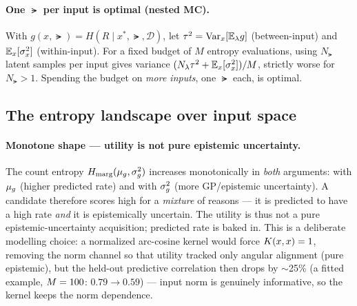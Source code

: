 \paragraph{One $\lat$ per input is optimal (nested MC).}
With $g(x,\lat)=H(R\mid x^{*},\lat,\mathcal D)$, let $\tau^{2}=\mathrm{Var}_x[\mathbb{E}_{\lambda}g]$
(between-input) and $\mathbb{E}_x[\sigma^{2}_x]$ (within-input). For a fixed budget of $M$
entropy evaluations, using $N_{\lat}$ latent samples per input gives variance
$(N_{\lambda}\tau^{2}+\mathbb{E}_x[\sigma^{2}_x])/M$, strictly worse for $N_{\lat}>1$.
Spending the budget on \emph{more inputs}, one $\lat$ each, is optimal.


\subsection{The entropy landscape over input space}
\label{subsec:landscape}

\paragraph{Monotone shape --- utility is not pure epistemic uncertainty.}
The count entropy $H_{\mathrm{marg}}(\mu_{g},\sigma_{g}^{2})$ increases monotonically in \emph{both}
arguments: with $\mu_{g}$ (higher predicted rate) and with $\sigma_{g}^{2}$ (more
GP/epistemic uncertainty). A candidate therefore scores high for a \emph{mixture}
of reasons --- it is predicted to have a high rate \emph{and} it is epistemically
uncertain. The utility is thus not a pure epistemic-uncertainty acquisition;
predicted rate is baked in. This is a deliberate modelling choice: a normalized
arc-cosine kernel would force $K(x,x)=1$, removing the norm channel so that
utility tracked only angular alignment (pure epistemic), but the held-out
predictive correlation then drops by $\sim$25\% (a fitted example, $M=100$:
$0.79\!\to\!0.59$) --- input norm is genuinely informative, so the kernel keeps the
norm dependence.

